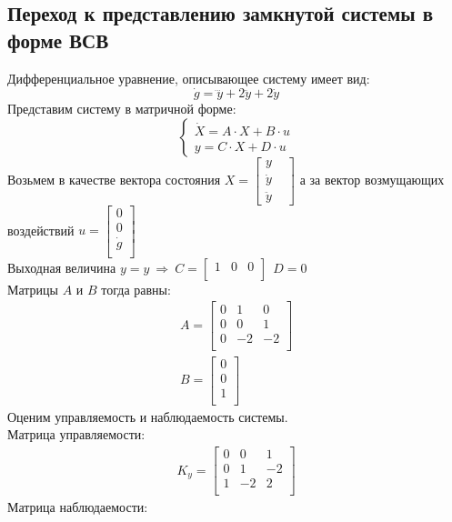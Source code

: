 \documentclass[a4paper,12pt]{article}
\begin{document}
	\subsection{Переход к представлению замкнутой системы в форме ВСВ}
	Дифференциальное уравнение, описывающее систему имеет вид:\\
	\begin{equation}
	\dot{g}=\dddot{y}+2\ddot{y}+2\dot{y}
	\end{equation}
	Представим систему в матричной форме:\\
	\begin{equation}
	\begin{cases}
	\dot{X}=A\cdot X + B\cdot u 
	\\
	y = C\cdot X + D\cdot u
	\end{cases}
	\end{equation}
	Возьмем в качестве вектора состояния $X=\begin{bmatrix}
	y & \\
	\dot{y} &\\
	\ddot{y} 
	\end{bmatrix}$
	а за вектор возмущающих воздействий $u=\begin{bmatrix}
	0 \\
	0 \\
	\dot{g}\\ \end{bmatrix}$ \\
	\noindent Выходная величина $y=y ~\Rightarrow~ C=\begin{bmatrix}
	1 & 0 & 0 \\ \end{bmatrix} ~~D=0$ \\
	Матрицы $A$ и $B$ тогда равны:\\ 
	\begin{gather}
	\displaystyle A=\begin{bmatrix}
	 0 & 1 & 0\\
	0 & 0 & 1\\
	0 & -2 & -2\\
	\end{bmatrix} 
	\\ B=\begin{bmatrix}
	0 \\
	0 \\
	1\\
	\end{bmatrix}
	\end{gather}
	Оценим управляемость и наблюдаемость системы.\\
	Матрица управляемости:\\
	\begin{gather}
	\displaystyle K_y=\begin{bmatrix}
	0 & 0 & 1\\
	0 & 1 & -2\\
	1 & -2 & 2\\
	\end{bmatrix} 
		\end{gather}
		Матрица наблюдаемости:\\
	
\end{document}
